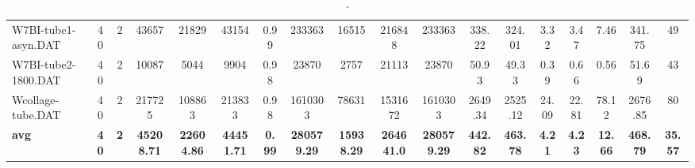 \begin{sidewaystable}[h]
{\begin{tabular}{lccccccccccccccccc}
W7BI-tube1-asyn.DAT & 40 & 2 & 43657 & 21829 & 43154 & 0.99 & 233363 & 16515 & 216848 & 233363 & 338.22 & 324.01 & 3.32 & 3.47 & 7.46 & 341.75 & 49\\
W7BI-tube2-1800.DAT & 40 & 2 & 10087 & 5044 & 9904 & 0.98 & 23870 & 2757 & 21113 & 23870 & 50.93 & 49.33 & 0.39 & 0.66 & 0.56 & 51.69 & 43\\
Wcollage-tube.DAT & 40 & 2 & 217725 & 108863 & 213833 & 0.98 & 1610303 & 78631 & 1531672 & 1610303 & 2649.34 & 2525.12 & 24.09 & 22.81 & 78.12 & 2676.85 & 80\\
\cline{1-18} \textbf{avg} & \textbf{40} & \textbf{2} & \textbf{45208.71} & \textbf{22604.86} & \textbf{44451.71} & \textbf{0.99} & \textbf{280579.29} & \textbf{15938.29} & \textbf{264641.0} & \textbf{280579.29} & \textbf{442.82} & \textbf{463.78} & \textbf{4.21} & \textbf{4.23} & \textbf{12.66} & \textbf{468.79} & \textbf{35.57} \\ \cline{1-18}
\bottomrule
\end{tabular}%
}%
\caption{.}
\label{tab:table_bc}
\end{sidewaystable}

